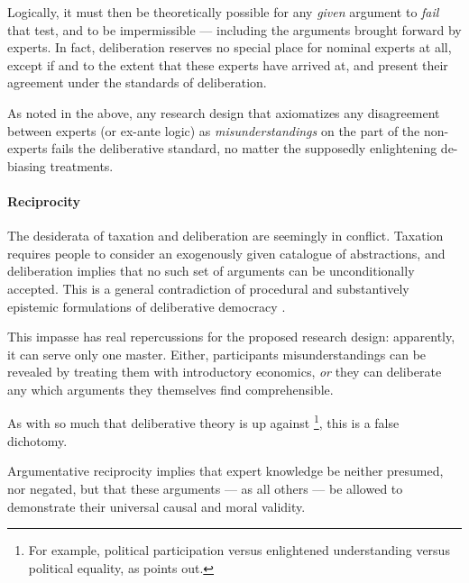 Logically, it must then be theoretically possible for any \emph{given} argument to \emph{fail} that test, and to be impermissible --- including the arguments brought forward by experts.
In fact, deliberation reserves no special place for nominal experts at all, except if and to the extent that these experts have arrived at, and present their agreement under the standards of deliberation.

As noted in the above, any research design that axiomatizes any disagreement between experts (or ex-ante logic) as \emph{misunderstandings} on the part of the non-experts fails the deliberative standard, no matter the supposedly enlightening de-biasing treatments.

\paragraph{Reciprocity}
The desiderata of taxation and deliberation are seemingly in conflict.
Taxation requires people to consider an exogenously given catalogue of abstractions, and deliberation implies that no such set of arguments can be unconditionally accepted.
This is a general contradiction of procedural and substantively epistemic formulations of deliberative democracy \cite[402]{Bohman1998}.

This impasse has real repercussions for the proposed research design:
apparently, it can serve only one master.
Either, participants misunderstandings can be revealed by treating them with introductory economics, \emph{or} they can deliberate any which arguments they themselves find comprehensible.

As with so much that deliberative theory is up against
\footnote{
	For example, political participation versus enlightened understanding versus political equality, as \citeauthor{Fishkin2009} points out.
}, %
this is a false dichotomy.

Argumentative reciprocity implies that expert knowledge be neither presumed, nor negated, but that these arguments --- as all others --- be allowed to demonstrate their universal causal and moral validity.


